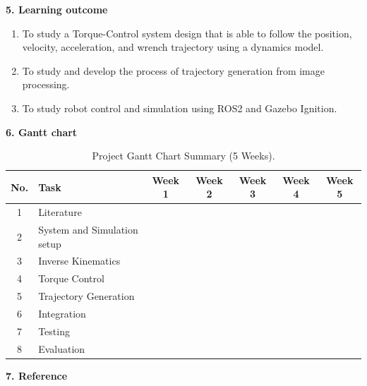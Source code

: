 \documentclass[10pt]{article}
\begin{document}
\newpage

\large
\noindent
\textbf{5. Learning outcome} \\
\normalsize
\begin{enumerate}[nosep, itemsep=-2pt]
    \item To study a Torque-Control system design that is able to follow the position, velocity, acceleration, and wrench trajectory using a dynamics model. 
    \item To study and develop the process of trajectory generation from image processing.
    \item To study robot control and simulation using ROS2 and Gazebo Ignition.
\end{enumerate}

\large
\noindent
\textbf{6. Gantt chart} \\
\normalsize
\renewcommand{\figurename}{Table} %
\begin{table}[h]
\centering
\begin{tabular}{|c|l|c|c|c|c|c|}
\hline
\textbf{No.} & \textbf{Task} & \textbf{Week 1} & \textbf{Week 2} & \textbf{Week 3} & \textbf{Week 4} & \textbf{Week 5} \\ \hline
1 & Literature & \cellcolor{ganttbar} &  &  &  &  \\ \hline
2 & System and Simulation setup & \cellcolor{ganttbar} &  &  &  &  \\ \hline
3 & Inverse Kinematics &  & \cellcolor{ganttbar} &  &  &  \\ \hline
4 & Torque Control &  & \cellcolor{ganttbar} & \cellcolor{ganttbar}  &  &  \\ \hline
5 & Trajectory Generation &  & \cellcolor{ganttbar} & \cellcolor{ganttbar}  &  &  \\ \hline
6 & Integration &  &  & \cellcolor{ganttbar} &  &  \\ \hline
7 & Testing &  &  &  & \cellcolor{ganttbar} &  \\ \hline
8 & Evaluation &  &  &  &  & \cellcolor{ganttbar} \\ \hline
\end{tabular}
\caption{Project Gantt Chart Summary (5 Weeks).}
\label{tab:gantt_excel}
\end{table}


\large
\noindent
\textbf{7. Reference} \\
\normalsize 
\end{document}
